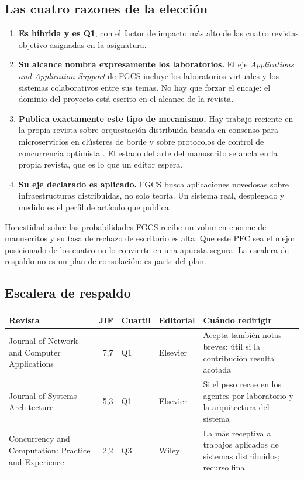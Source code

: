 \documentclass[11pt,a4paper]{article}
\begin{document}
\subsection{Las cuatro razones de la elección}

\begin{enumerate}[leftmargin=*,itemsep=5pt]
	\item \textbf{Es híbrida y es Q1}, con el factor de impacto más alto de las cuatro revistas objetivo asignadas en la asignatura.
	\item \textbf{Su alcance nombra expresamente los laboratorios.} El eje \emph{Applications and Application Support} de FGCS incluye los laboratorios virtuales y los sistemas colaborativos entre sus temas. No hay que forzar el encaje: el dominio del proyecto está escrito en el alcance de la revista.
	\item \textbf{Publica exactamente este tipo de mecanismo.} Hay trabajo reciente en la propia revista sobre orquestación distribuida basada en consenso para microservicios en clústeres de borde \cite{morabito2026consensus} y sobre protocolos de control de concurrencia optimista \cite{wang2024dodo}. El estado del arte del manuscrito se ancla en la propia revista, que es lo que un editor espera.
	\item \textbf{Su eje declarado es aplicado.} FGCS busca aplicaciones novedosas sobre infraestructuras distribuidas, no solo teoría. Un sistema real, desplegado y medido es el perfil de artículo que publica.
\end{enumerate}

\begin{alerta}{Honestidad sobre las probabilidades}
	FGCS recibe un volumen enorme de manuscritos y su tasa de rechazo de escritorio es alta. Que este PFC sea el mejor posicionado de los cuatro no lo convierte en una apuesta segura. La escalera de respaldo no es un plan de consolación: es parte del plan.
\end{alerta}

\subsection{Escalera de respaldo}

\begin{center}
	\small
	\begin{tabular}{@{}p{5.4cm}rp{1.5cm}p{2.0cm}p{4.3cm}@{}}
		\toprule
		\textbf{Revista} & \textbf{JIF} & \textbf{Cuartil} & \textbf{Editorial} & \textbf{Cuándo redirigir} \\
		\midrule
		Journal of Network and Computer Applications & 7,7 & Q1 & Elsevier & Acepta también notas breves: útil si la contribución resulta acotada \\
		\addlinespace
		Journal of Systems Architecture & 5,3 & Q1 & Elsevier & Si el peso recae en los agentes por laboratorio y la arquitectura del sistema \\
		\addlinespace
		Concurrency and Computation: Practice and Experience & 2,2 & Q3 & Wiley & La más receptiva a trabajos aplicados de sistemas distribuidos; recurso final \\
		\bottomrule
	\end{tabular}
\end{center}
\end{document}
